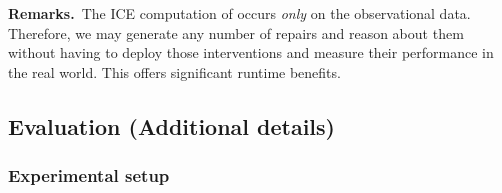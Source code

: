 


\noindent \textbf{Remarks.}~The ICE computation of  occurs \textit{only} on the observational data. Therefore, we may generate any number of repairs and reason about them without having to deploy those interventions and measure their performance in the real world. This offers significant runtime benefits.

\subsection{Evaluation (Additional details)}

\subsubsection{Experimental setup}

